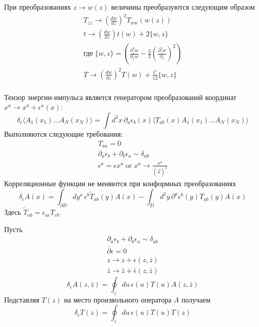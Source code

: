 \documentclass[a4paper,12pt]{article}
\theoremstyle{definition} \newtheorem{Def}{Definition}
\begin{document}
При преобразованиях $z\to w(z)$ величины преобразуются следующим образом
\begin{equation}
  \label{eq:51}
  \begin{split}
    T_{zz}\to \left(\frac{dw}{dz}\right)^2 T_{ww}(w(z))\\
    t\to \left(\frac{dw}{dz}\right)t(w)+2\{w,z\}\\
    \mbox{где}\; \{w,z\}=\left(\frac{\partial_z^3 w}{\partial_z w}-\frac{3}{2}\left(\frac{\partial_z^2 w}{\partial_z}\right)^2\right)\\
    T\to \left(\frac{dw}{dz}\right)^2 T(w)+\frac{C}{12}\{w,z\}\\
  \end{split}
\end{equation}

Тензор энергии-импульса является генератором преобразований координат $x^a\to x^a+\epsilon^a(x)$:
\begin{equation}
  \label{eq:52}
  \delta_{\epsilon}\langle A_1(x_1)\dots A_N(x_N)\rangle = \int d^2x\, \partial_a \epsilon_b(x)\langle T_{ab}(x) A_1(x_1)\dots A_N(x_N)\rangle
\end{equation}
Выполняются следующие требования:
\begin{equation}
  \label{eq:53}
  \begin{split}
    T_{aa}=0\\
    \partial_a \epsilon_b+\partial_b \epsilon_a\sim \delta_{ab}\\
    \epsilon^a=\epsilon x^a \;\mbox{or}\; x^a\to \frac{x^a}{(\vec x)^2}
  \end{split}
\end{equation}
Корреляционные функции не меняются при конформных преобразованиях
\begin{equation}
  \label{eq:54}
  \delta_{\epsilon}A(x)=\int_{\partial D} dy^a\, \epsilon^b \tilde{T}_{ab}(y)A(x)-\int_{D}d^2y\, \partial^a \epsilon^b(y)T_{ab}(y)A(x)
\end{equation}
Здесь $\tilde{T}_{ab}=\epsilon_{ac}T_{cb}$.

Пусть
\begin{equation}
  \label{eq:55}
  \begin{split}
    \partial_a \epsilon_b+\partial_b \epsilon_a\sim \delta_{ab}\\
    \bar{\partial}\epsilon=0\\
    z\to z+\epsilon(z,\bar{z})\\
    \bar{z}\to\bar{z}+\bar{\epsilon}(z,\bar{z})
  \end{split}
\end{equation}
\begin{equation}
  \label{eq:56}
  \delta_{\epsilon}A(z,\bar{z})=\oint_z du\, \epsilon(u) T(u) A(z,\bar{z})
\end{equation}
Подставляя $T(z)$ на место произвольного оператора $A$ получаем
\begin{equation}
  \label{eq:57}
  \delta_{\epsilon}T(z)=\oint_z du\, \epsilon(u)T(u)T(z)
\end{equation}
\end{document}
